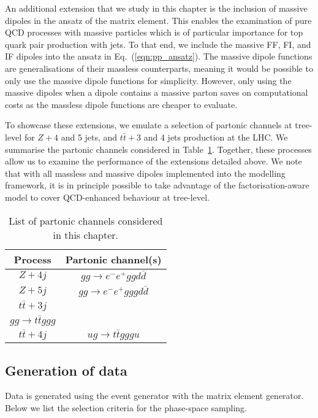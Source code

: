 \documentclass[main.tex]{subfiles}
\begin{document}
An additional extension that we study in this chapter is the
inclusion of massive dipoles in the ansatz of the matrix element.
This enables the examination of pure QCD processes with massive
particles which is of particular importance for top quark pair
production with jets. To that end, we include the massive FF, FI,
and IF dipoles into the ansatz in Eq.~(\ref{eqn:pp_ansatz}).
The massive dipole functions are
generalisations of their massless counterparts, meaning it would
be possible to only use the massive dipole functions for simplicity.
However, only using the massive dipoles when a dipole contains a
massive parton saves on computational costs as the massless dipole
functions are cheaper to evaluate.

To showcase these extensions, we emulate a selection of partonic
channels at tree-level for $Z+4$ and 5 jets, and $t\bar{t}+3$ and 4 jets
production at the LHC. We summarise the partonic channels considered
in Table~\ref{table:pp_partonic_channels}.
Together, these processes allow us to examine the performance
of the extensions detailed above.
We note that with all massless and massive dipoles implemented
into the modelling framework, it is in principle possible to
take advantage of the factorisation-aware model to cover
QCD-enhanced behaviour at tree-level.

\begin{table}
    \centering
    \begin{tabular}{cc}
        \toprule
        Process & Partonic channel(s) \\
        \midrule
        $Z+4j$ & $gg \rightarrow e^{-}e^{+}ggd\bar{d}$ \\
        \midrule
        $Z+5j$ & $gg \rightarrow e^{-}e^{+}gggd\bar{d}$ \\
        \midrule
        $t\bar{t}+3j$ & \makecell{$u\bar{u} \rightarrow t\bar{t}gd\bar{d}$ \\ $gg \rightarrow t\bar{t}ggg$} \\
        \midrule
        $t\bar{t}+4j$ & $ug \rightarrow t\bar{t}gggu$ \\
        \bottomrule
    \end{tabular}
    \caption{List of partonic channels considered in this chapter.}
    \label{table:pp_partonic_channels}
\end{table}

\subsection{Generation of data}\label{sec:pp_data}
Data is generated using the {\Sherpa} event generator
with the {\Amegic} matrix element generator.
Below we list the selection criteria for the phase-space sampling.
\end{document}
